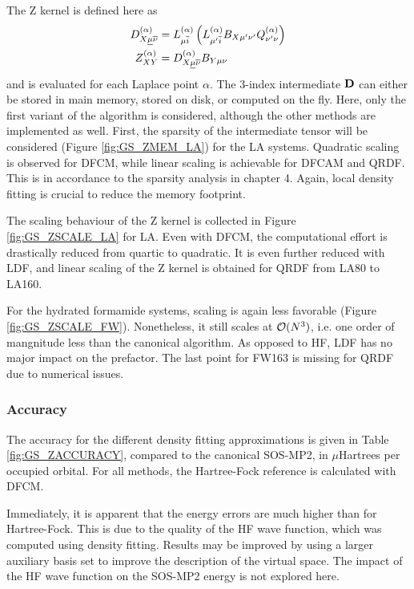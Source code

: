 The Z kernel is defined here as
\begin{align}
D^{(\alpha)}_{X\underline{\mu}\overline{\nu}} &= L^{(\alpha)}_{\mu\overline{i}} \left( L^{(\alpha)}_{\mu' \overline{i}} B_{X\mu'\nu'}  Q^{(\alpha)}_{\nu'\nu} \right) \\
Z_{XY}^{(\alpha)} &= D^{(\alpha)}_{X\underline{\mu}\overline{\nu}} B_{Y\mu\nu}
\end{align}
\noindent and is evaluated for each Laplace point $\alpha$. The 3-index intermediate $\mathbf{D}$ can either be stored in main memory, stored on disk, or computed on the fly. Here, only the first variant of the algorithm is considered, although the other methods are implemented as well. First, the sparsity of the intermediate tensor will be considered (Figure \ref{fig:GS_ZMEM_LA}) for the LA systems. Quadratic scaling is observed for DFCM, while linear scaling is achievable for DFCAM and QRDF. This is in accordance to the sparsity analysis in chapter 4. Again, local density fitting is crucial to reduce the memory footprint.

The scaling behaviour of the Z kernel is collected in Figure \ref{fig:GS_ZSCALE_LA} for LA. Even with DFCM, the computational effort is drastically reduced from quartic to quadratic. It is even further reduced with LDF, and linear scaling of the Z kernel is obtained for QRDF from LA80 to LA160. 

For the hydrated formamide systems, scaling is again less favorable (Figure \ref{fig:GS_ZSCALE_FW}). Nonetheless, it still scales at $\mathcal{O}(N^{3})$, i.e. one order of mangnitude less than the canonical algorithm. As opposed to HF, LDF has no major impact on the prefactor. The last point for FW163 is missing for QRDF due to numerical issues.  

\subsubsection{Accuracy}

The accuracy for the different density fitting approximations is given in Table \ref{fig:GS_ZACCURACY}, compared to the canonical SOS-MP2, in $\mu$Hartrees per occupied orbital. For all methods, the Hartree-Fock reference is calculated with DFCM.

Immediately, it is apparent that the energy errors are much higher than for Hartree-Fock. This is due to the quality of the HF wave function, which was computed using density fitting. Results may be improved by using a larger auxiliary basis set to improve the description of the virtual space. The impact of the HF wave function on the SOS-MP2 energy is not explored here.


